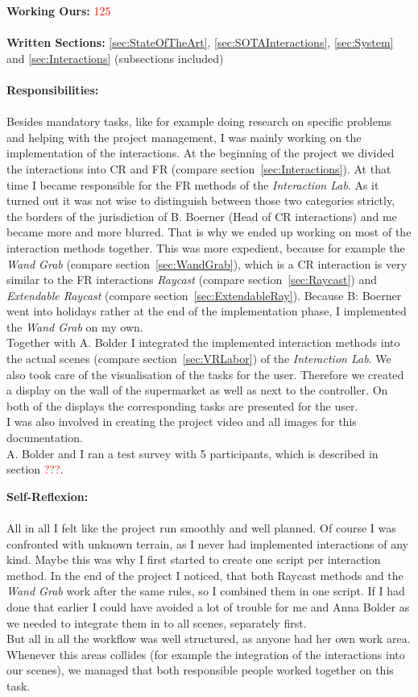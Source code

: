 \textbf{Working Ours:} \textcolor{red}{125} \\ \\
\textbf{Written Sections:} \ref{sec:StateOfTheArt},  \ref{sec:SOTAInteractions}, \ref{sec:System} and \ref{sec:Interactions} (subsections included) \\ \\
\textbf{Responsibilities:}\\ \\
Besides mandatory tasks, like for example doing research on specific problems and helping with the project management, I was mainly working on the implementation of the interactions. At the beginning of the project we divided the interactions into CR and FR (compare section~\ref{sec:Interactions}). At that time I became responsible for the FR methods of the \textit{Interaction Lab}. As it turned out it was not wise to distinguish between those two categories strictly, the borders of the jurisdiction of B. Boerner (Head of CR interactions) and me became more and more blurred. That is why we ended up working on most of the interaction methods together. This was more expedient, because for example the \textit{Wand Grab} (compare section~\ref{sec:WandGrab}), which is a CR interaction is very similar to the FR interactions \textit{Raycast} (compare section~\ref{sec:Raycast}) and \textit{Extendable Raycast} (compare section~\ref{sec:ExtendableRay}). Because B: Boerner went into holidays rather at the end of the implementation phase, I implemented the \textit{Wand Grab} on my own. \\
Together with A. Bolder I integrated the implemented interaction methods into the actual scenes (compare section~\ref{sec:VRLabor}) of the \textit{Interaction Lab}. We also took care of the visualisation of the tasks for the user. Therefore we created a display on the wall of the supermarket as well as next to the controller. On both of the displays the corresponding tasks are presented for the user. \\
I was also involved in creating the project video and all images for this documentation.\\
A. Bolder and I ran a test survey with 5 participants, which is described in section \textcolor{red}{???}.

\textbf{Self-Reflexion:}\\ \\
All in all I felt like the project run smoothly and well planned. Of course I was confronted with unknown terrain, as I never had implemented interactions of any kind. Maybe this was why I first started to create one script per interaction method. In the end of the project I noticed, that both Raycast methods and the \textit{Wand Grab} work after the same rules, so I combined them in one script. If I had done that earlier I could have avoided a lot of trouble for me and Anna Bolder as we needed to integrate them in to all scenes, separately first. \\
But all in all the workflow was well structured, as anyone had her own work area. Whenever this areas collides (for example the integration of the interactions into our scenes), we managed that both responsible people worked together on this task.

